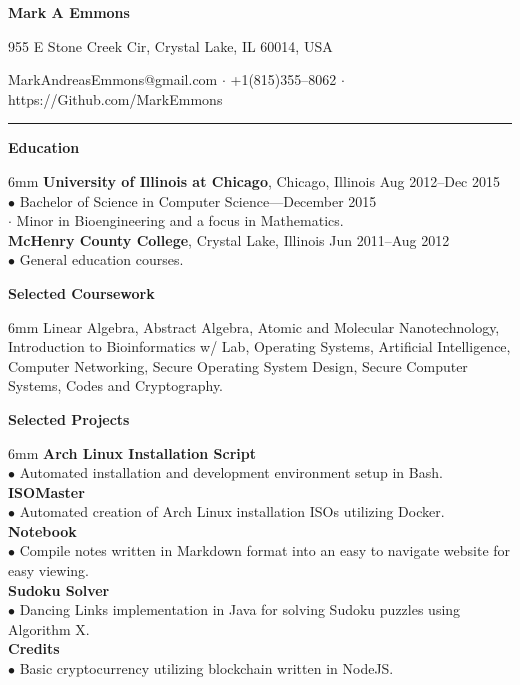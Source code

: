 \documentclass[11pt]{article}
\newcommand{\sectionheader}[1]{\noindent \textbf{\large #1}}
\newenvironment{sectionbody}{\begin{adjustwidth}{6mm}{}}{\end{adjustwidth}}
\begin{document}

\centerline{\LARGE \bf Mark A Emmons}
\centerline{955 E Stone Creek Cir, Crystal Lake, IL 60014, USA}
\centerline{MarkAndreasEmmons@gmail.com $\cdot$ +1(815)355--8062 $\cdot$ https://Github.com/MarkEmmons}

\noindent\rule{16.5cm}{0.4pt}

\sectionheader{Education}
\begin{sectionbody}
{\bf University of Illinois at Chicago}, Chicago, Illinois \hfill Aug 2012--Dec 2015 \\
$\bullet$ Bachelor of Science in Computer Science---December 2015 \\
\indent $\cdot$ Minor in Bioengineering and a focus in Mathematics. \\
{\bf McHenry County College}, Crystal Lake, Illinois \hfill Jun 2011--Aug 2012 \\
$\bullet$ General education courses.
\end{sectionbody}

\vspace{2mm}

\sectionheader{Selected Coursework}
\begin{sectionbody}
Linear Algebra, Abstract Algebra, Atomic and Molecular Nanotechnology, Introduction to Bioinformatics w/ Lab, Operating Systems, Artificial Intelligence, Computer Networking, Secure Operating System Design, Secure Computer Systems, Codes and Cryptography.
\end{sectionbody}

\vspace{2mm}

\sectionheader{Selected Projects}
\begin{sectionbody}
{\bf Arch Linux Installation Script} \\
$\bullet$ Automated installation and development environment setup in Bash. \\
{\bf ISOMaster} \\
$\bullet$ Automated creation of Arch Linux installation ISOs utilizing Docker. \\
{\bf Notebook} \\
$\bullet$ Compile notes written in Markdown format into an easy to navigate website for easy viewing. \\
{\bf Sudoku Solver} \\
$\bullet$ Dancing Links implementation in Java for solving Sudoku puzzles using Algorithm X. \\
{\bf Credits} \\
$\bullet$ Basic cryptocurrency utilizing blockchain written in NodeJS. \\
\end{sectionbody}
\end{document}
